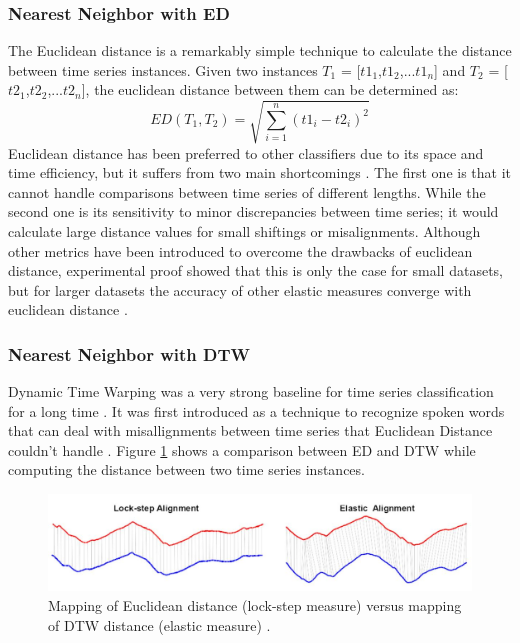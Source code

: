 \subsubsection{Nearest Neighbor with ED}
The Euclidean distance is a remarkably simple technique to calculate the distance between time series instances.
Given two instances  $T_{1}$ = [$t1_{1}$,$t1_{2}$,...$t1_{n}$]
and $T_{2}$ = [$t2_{1}$,$t2_{2}$,...$t2_{n}$], the euclidean distance
between them can be determined as:
\begin{equation}
    ED(T_{1},T_{2})= \sqrt{\sum_{i=1}^{n} (t1_{i} - t2_{i})^{2}}
\end{equation}
Euclidean distance has been preferred to other classifiers due to its space and time efficiency, but it suffers from two main shortcomings \cite{baydogan2013bag, jeong2011weighted,kate2016using}.
The first one is that it cannot handle comparisons between time series of different lengths.
While the second one is its sensitivity to minor discrepancies between time series; it would calculate large distance values for small shiftings or misalignments.
Although other metrics have been introduced to overcome the drawbacks of euclidean distance,
experimental proof showed that this is only the case for small datasets, but for larger datasets the accuracy of other elastic measures
converge with euclidean distance \cite{hills2014classification,ding2008querying,bagnall2012transformation}.


\subsubsection{Nearest Neighbor with DTW}
\label{SubsubsectionDTW}
Dynamic Time Warping was a very strong baseline for time series classification for a long time \cite{abanda2019review,bagnall2017great}.
It was first introduced as a technique to recognize spoken words that can deal with misallignments between time series
that Euclidean Distance couldn't handle \cite{tan2020fastee}.
Figure \ref{Img:ED_vs_DTW} shows a comparison between ED and DTW while computing the distance between two time series instances.

\begin{figure}[!htbp]
    \captionsetup{justification=raggedright}
    \centering
    \includegraphics[scale = 0.5]{ED_vs_DTW.JPG}
    \centering
    \caption{Mapping of Euclidean distance (lock-step measure) versus mapping of DTW distance (elastic measure) \cite{abanda2019review}.}
    \label{Img:ED_vs_DTW}
\end{figure}

